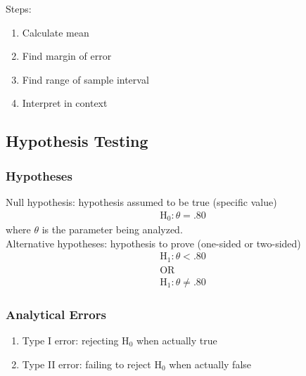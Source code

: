 \documentclass[12pt]{article}
\numberwithin{equation}{section}
\begin{document}
Steps:
\begin{enumerate}
    \item Calculate mean
    \item Find margin of error
    \item Find range of sample interval
    \item Interpret in context
\end{enumerate}

\subsection{Hypothesis Testing}


\subsubsection{Hypotheses}
Null hypothesis: hypothesis assumed to be true (specific value)
\begin{gather}
    \text{H}_0 : \theta = .80
\end{gather}
where $\theta$ is the parameter being analyzed. \\[0.5cm]
Alternative hypotheses: hypothesis to prove (one-sided or two-sided)
\begin{gather}
    \text{H}_1 : \theta < .80 \\
    \text{OR} \\
    \text{H}_1 : \theta \neq .80
\end{gather}

\subsubsection{Analytical Errors}
\begin{enumerate}
    \item Type I error: rejecting H$_0$ when actually true
    \item Type II error: failing to reject H$_0$ when actually false
\end{enumerate}
\end{document}
